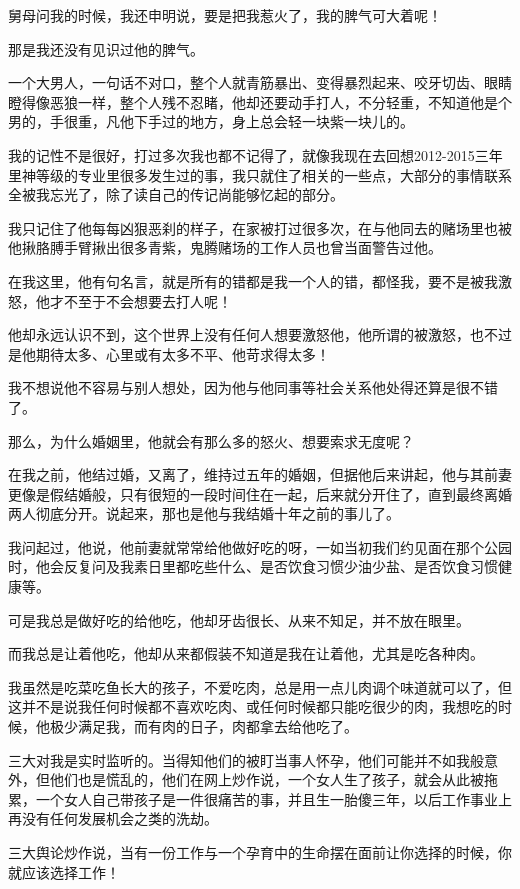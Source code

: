 \documentclass[9pt, b5paper]{article}
\begin{document}
舅母问我的时候，我还申明说，要是把我惹火了，我的脾气可大着呢！

那是我还没有见识过他的脾气。

一个大男人，一句话不对口，整个人就青筋暴出、变得暴烈起来、咬牙切齿、眼睛瞪得像恶狼一样，整个人残不忍睹，他却还要动手打人，不分轻重，不知道他是个男的，手很重，凡他下手过的地方，身上总会轻一块紫一块儿的。

我的记性不是很好，打过多次我也都不记得了，就像我现在去回想2012-2015三年里神等级的专业里很多发生过的事，我只就住了相关的一些点，大部分的事情联系全被我忘光了，除了读自己的传记尚能够忆起的部分。

我只记住了他每每凶狠恶刹的样子，在家被打过很多次，在与他同去的赌场里也被他揪胳膊手臂揪出很多青紫，鬼腾赌场的工作人员也曾当面警告过他。

在我这里，他有句名言，就是所有的错都是我一个人的错，都怪我，要不是被我激怒，他才不至于不会想要去打人呢！

他却永远认识不到，这个世界上没有任何人想要激怒他，他所谓的被激怒，也不过是他期待太多、心里或有太多不平、他苛求得太多！

我不想说他不容易与别人想处，因为他与他同事等社会关系他处得还算是很不错了。

那么，为什么婚姻里，他就会有那么多的怒火、想要索求无度呢？

在我之前，他结过婚，又离了，维持过五年的婚姻，但据他后来讲起，他与其前妻更像是假结婚般，只有很短的一段时间住在一起，后来就分开住了，直到最终离婚两人彻底分开。说起来，那也是他与我结婚十年之前的事儿了。

我问起过，他说，他前妻就常常给他做好吃的呀，一如当初我们约见面在那个公园时，他会反复问及我素日里都吃些什么、是否饮食习惯少油少盐、是否饮食习惯健康等。

可是我总是做好吃的给他吃，他却牙齿很长、从来不知足，并不放在眼里。

而我总是让着他吃，他却从来都假装不知道是我在让着他，尤其是吃各种肉。

我虽然是吃菜吃鱼长大的孩子，不爱吃肉，总是用一点儿肉调个味道就可以了，但这并不是说我任何时候都不喜欢吃肉、或任何时候都只能吃很少的肉，我想吃的时候，他极少满足我，而有肉的日子，肉都拿去给他吃了。 


三大对我是实时监听的。当得知他们的被盯当事人怀孕，他们可能并不如我般意外，但他们也是慌乱的，他们在网上炒作说，一个女人生了孩子，就会从此被拖累，一个女人自己带孩子是一件很痛苦的事，并且生一胎傻三年，以后工作事业上再没有任何发展机会之类的洗劫。

三大舆论炒作说，当有一份工作与一个孕育中的生命摆在面前让你选择的时候，你就应该选择工作！
\end{document}
